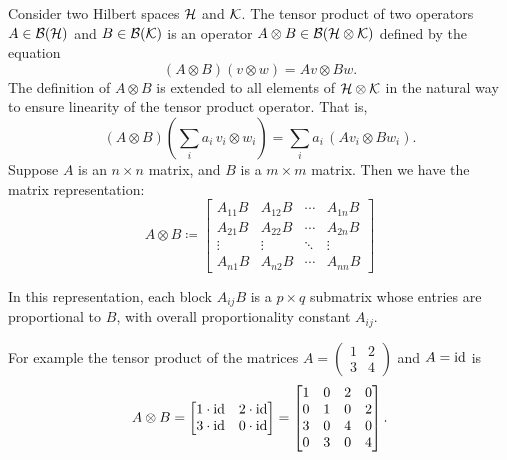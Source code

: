 \begin{definition}
  Consider two Hilbert spaces $\mathcal{H}$ and $\mathcal{K}$. 
  The tensor product of two operators $A \in \mathcal{B}(\mathcal{H}) $ and $B \in   \mathcal{B}(\mathcal{K})$ is an operator $A \otimes B \in  \mathcal{B}(\mathcal{H} \otimes \mathcal{K}) $ defined by the equation
\begin{equation*}
  (A \otimes B)(v \otimes w) = Av \otimes Bw.
\end{equation*}
The definition of $A \otimes B$ is extended to all elements of $\mathcal{H} \otimes \mathcal{K}$ in the natural way to ensure linearity of the tensor product operator. That is,
\begin{equation*} \label{eq:linear_tensor_operator}
(A \otimes B) \left( \sum_i a_i\, v_i \otimes w_i \right)
= \sum_i a_i\, (A v_i \otimes B w_i).
\end{equation*}
Suppose $A$ is an $n \times n$ matrix, and $B$ is a $m \times m$ matrix. Then we have the matrix representation:
\begin{equation*} \label{eq:matrix_tensor_product}
A \otimes B \coloneqq
\begin{bmatrix}
A_{11} B & A_{12} B & \cdots & A_{1n} B \\
A_{21} B & A_{22} B & \cdots & A_{2n} B \\
\vdots   & \vdots   & \ddots & \vdots   \\
A_{n1} B & A_{n2} B & \cdots & A_{nn} B
\end{bmatrix}
\end{equation*}

In this representation, each block $A_{ij} B$ is a $p \times q$ submatrix whose entries are proportional to $B$, with overall proportionality constant $A_{ij}$.


For example the tensor product of the matrices $A= \left(\begin{smallmatrix}
    1 & 2 \\
    3 & 4
  \end{smallmatrix}\right) $ and $A=\mathrm{id} $ is
\begin{equation} \label{eq:pauli_tensor}
A \otimes B =
\begin{bmatrix}
1 \cdot \mathrm{id} & 2 \cdot \mathrm{id} \\
3 \cdot \mathrm{id} & 0 \cdot \mathrm{id}
\end{bmatrix}
=
\begin{bmatrix}
1 & 0 & 2 & 0 \\
0 & 1 & 0 & 2 \\
3 & 0 & 4 & 0 \\
0 & 3 & 0 & 4
\end{bmatrix}.
\end{equation}

\end{definition}


